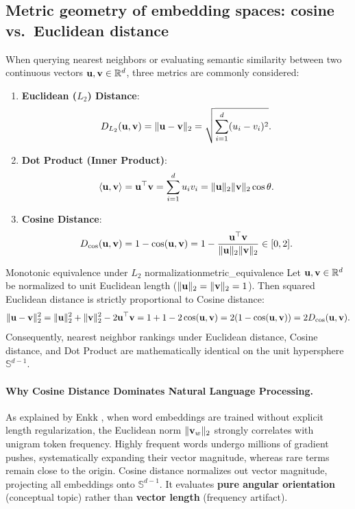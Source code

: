 \documentclass[../../main.tex]{subfiles}
\begin{document}
\subsection{Metric geometry of embedding spaces: cosine vs.~Euclidean distance}
\label{subsec:metric_geometry}

When querying nearest neighbors or evaluating semantic similarity between two continuous vectors $\mathbf{u}, \mathbf{v} \in \mathbb{R}^d$, three metrics are commonly considered:
\begin{enumerate}
    \item \textbf{Euclidean ($L_2$) Distance}:
    \begin{equation}
    \label{eq:euclidean_dist}
    D_{L_2}(\mathbf{u}, \mathbf{v}) = \|\mathbf{u} - \mathbf{v}\|_2 = \sqrt{\sum_{i=1}^d (u_i - v_i)^2}.
    \end{equation}
    \item \textbf{Dot Product (Inner Product)}:
    \begin{equation}
    \label{eq:dot_prod_metric}
    \langle\mathbf{u}, \mathbf{v}\rangle = \mathbf{u}^\top \mathbf{v} = \sum_{i=1}^d u_i v_i = \|\mathbf{u}\|_2 \|\mathbf{v}\|_2 \cos \theta.
    \end{equation}
    \item \textbf{Cosine Distance}:
    \begin{equation}
    \label{eq:cosine_dist_def}
    D_{\cos}(\mathbf{u}, \mathbf{v}) = 1 - \cos(\mathbf{u}, \mathbf{v}) = 1 - \frac{\mathbf{u}^\top \mathbf{v}}{\|\mathbf{u}\|_2 \|\mathbf{v}\|_2} \in [0, 2].
    \end{equation}
\end{enumerate}

\begin{theorem}{Monotonic equivalence under $L_2$ normalization}{metric_equivalence}
Let $\mathbf{u}, \mathbf{v} \in \mathbb{R}^d$ be normalized to unit Euclidean length ($\|\mathbf{u}\|_2 = \|\mathbf{v}\|_2 = 1$). Then squared Euclidean distance is strictly proportional to Cosine distance:
\begin{equation}
\label{eq:unit_norm_equiv}
\|\mathbf{u} - \mathbf{v}\|_2^2 = \|\mathbf{u}\|_2^2 + \|\mathbf{v}\|_2^2 - 2 \mathbf{u}^\top \mathbf{v} = 1 + 1 - 2 \cos(\mathbf{u}, \mathbf{v}) = 2(1 - \cos(\mathbf{u}, \mathbf{v})) = 2 D_{\cos}(\mathbf{u}, \mathbf{v}).
\end{equation}
Consequently, nearest neighbor rankings under Euclidean distance, Cosine distance, and Dot Product are mathematically identical on the unit hypersphere $\mathbb{S}^{d-1}$.
\end{theorem}

\paragraph{Why Cosine Distance Dominates Natural Language Processing.}
As explained by Enkk \cite{enkk2023embeddings}, when word embeddings are trained without explicit length regularization, the Euclidean norm $\|\mathbf{v}_w\|_2$ strongly correlates with unigram token frequency. Highly frequent words undergo millions of gradient pushes, systematically expanding their vector magnitude, whereas rare terms remain close to the origin.
Cosine distance normalizes out vector magnitude, projecting all embeddings onto $\mathbb{S}^{d-1}$. It evaluates \textbf{pure angular orientation} (conceptual topic) rather than \textbf{vector length} (frequency artifact).
\end{document}

